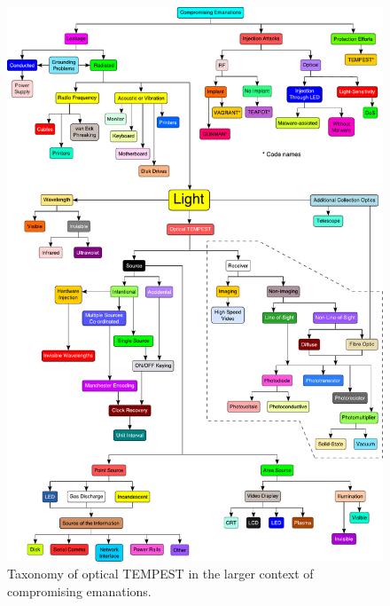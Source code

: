 \documentclass[a4paper,twoside,11pt,openany]{book}
\begin{document}
\begin{figure}[htp]
  \centering
  \includegraphics[width=\textwidth]{taxonomy.pdf}
  \caption{Taxonomy of optical TEMPEST in the larger context of compromising
    emanations.}
  \label{figure:taxonomy}
\end{figure}
\end{document}
